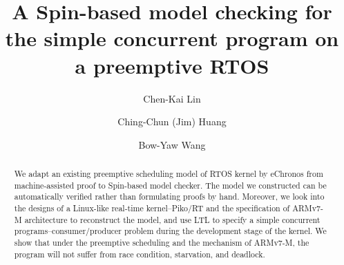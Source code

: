 \documentclass[sigconf]{acmart}
\begin{document}
\title{A Spin-based model checking for the simple concurrent program on a preemptive RTOS}


\author{Chen-Kai Lin}

\author{Ching-Chun (Jim) Huang}

\author{Bow-Yaw Wang}
\renewcommand{\shortauthors}{}


\begin{abstract}
We adapt an existing preemptive scheduling model of RTOS kernel by eChronos from machine-assisted proof to Spin-based model checker. The model we constructed can be automatically verified rather than formulating proofs by hand. Moreover, we look into the designs of a Linux-like real-time kernel--Piko/RT and the specification of ARMv7-M architecture to reconstruct the model, and use LTL to specify a simple concurrent programs--consumer/producer problem during the development stage of the kernel. We show that under the preemptive scheduling and the mechanism of ARMv7-M, the program will not suffer from race condition, starvation, and deadlock.
\end{abstract}



\maketitle





\end{document}
